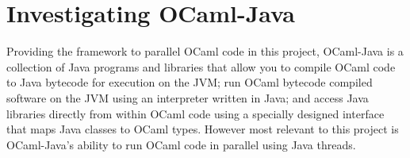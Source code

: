\documentclass[12pt,twoside,notitlepage]{report}
\begin{document}
\section{Investigating OCaml-Java}
\label{sec:investigating_ocaml-java}
%
%
Providing the framework to parallel OCaml code in this project, OCaml-Java is a collection of Java programs and libraries that allow you to compile OCaml code to Java bytecode for execution on the JVM; run OCaml bytecode compiled
software on the JVM using an interpreter written in Java; and access Java libraries directly from within OCaml code using a specially designed interface that maps Java classes to OCaml types. However most relevant to this project is
OCaml-Java's ability to run OCaml code in parallel using Java threads.
\end{document}
